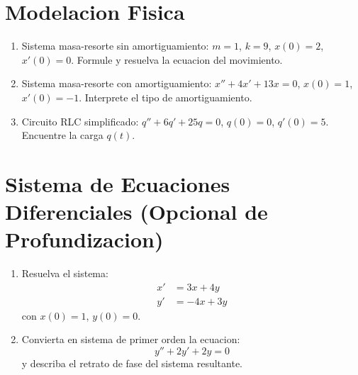 \documentclass[12pt,a4paper]{article}
\begin{document}
\section{Modelacion Fisica}

\begin{enumerate}
    \item Sistema masa-resorte sin amortiguamiento: $m=1$, $k=9$, $x(0)=2$, $x'(0)=0$. Formule y resuelva la ecuacion del movimiento.
    \item Sistema masa-resorte con amortiguamiento: $x''+4x'+13x=0$, $x(0)=1$, $x'(0)=-1$. Interprete el tipo de amortiguamiento.
    \item Circuito RLC simplificado: $q''+6q'+25q=0$, $q(0)=0$, $q'(0)=5$. Encuentre la carga $q(t)$.
\end{enumerate}

\section{Sistema de Ecuaciones Diferenciales (Opcional de Profundizacion)}

\begin{enumerate}
    \item Resuelva el sistema:
    \begin{align*}
        x' &= 3x+4y\\
        y' &= -4x+3y
    \end{align*}
    con $x(0)=1$, $y(0)=0$.

    \item Convierta en sistema de primer orden la ecuacion:
    $$y''+2y'+2y=0$$
    y describa el retrato de fase del sistema resultante.
\end{enumerate}
\end{document}
